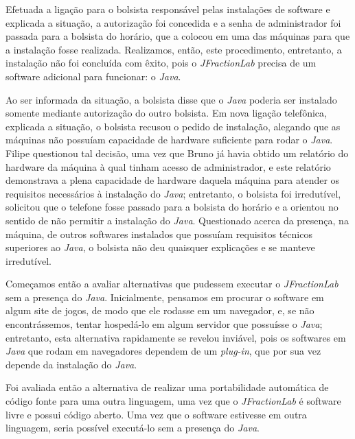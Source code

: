 Efetuada a ligação para o bolsista responsável pelas instalações de software e explicada a situação, a autorização foi concedida e a senha de administrador foi passada para a bolsista do horário, que a colocou em uma das máquinas para que a instalação fosse realizada. Realizamos, então, este procedimento, entretanto, a instalação não foi concluída com êxito, pois o \textit{JFractionLab} precisa de um software adicional para funcionar: o \textit{Java}.

Ao ser informada da situação, a bolsista disse que o \textit{Java} poderia ser instalado somente mediante autorização do outro bolsista. Em nova ligação telefônica, explicada a situação, o bolsista recusou o pedido de instalação, alegando que as máquinas não possuíam capacidade de hardware suficiente para rodar o \textit{Java}. Filipe questionou tal decisão, uma vez que Bruno já havia obtido um relatório do hardware da máquina à qual tinham acesso de administrador, e este relatório demonstrava a plena capacidade de hardware daquela máquina para atender os requisitos necessários à instalação do \textit{Java}; entretanto, o bolsista foi irredutível, solicitou que o telefone fosse passado para a bolsista do horário e a orientou no sentido de não permitir a instalação do \textit{Java}. Questionado acerca da presença, na máquina, de outros softwares instalados que possuíam requisitos técnicos superiores ao \textit{Java}, o bolsista não deu quaisquer explicações e se manteve irredutível.


Começamos então a avaliar alternativas que pudessem executar o \textit{JFractionLab} sem a presença do \textit{Java}. Inicialmente, pensamos em procurar o software em algum site de jogos, de modo que ele rodasse em um navegador, e, se não encontrássemos, tentar hospedá-lo em algum servidor que possuísse o \textit{Java}; entretanto, esta alternativa rapidamente se revelou inviável, pois os softwares em \textit{Java} que rodam em navegadores dependem de um \textit{plug-in}, que por sua vez depende da instalação do \textit{Java}.

Foi avaliada então a alternativa de realizar uma portabilidade automática de código fonte para uma outra linguagem, uma vez que o \textit{JFractionLab} é software livre e possui código aberto. Uma vez que o software estivesse em outra linguagem, seria possível executá-lo sem a presença do \textit{Java}.

